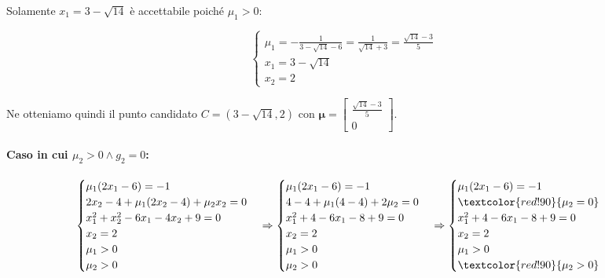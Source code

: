 \documentclass[\main/main.tex]{subfiles}
\begin{document}
Solamente $x_1 = 3 - \sqrt{14}$ è accettabile poiché $\mu_1 > 0$:

\[
	\begin{cases}
		\mu_1 = -\frac{1}{3 - \sqrt{14} - 6} =  \frac{1}{\sqrt{14} + 3} =  \frac{\sqrt{14} - 3}{5} \\
		x_1 = 3 - \sqrt{14}                                                                        \\
		x_2 = 2
	\end{cases}
\]

Ne otteniamo quindi il punto candidato $C = (3 - \sqrt{14}, 2)$ con $\bm{\mu} = \begin{bmatrix}
		\frac{\sqrt{14} - 3}{5} \\
		0
	\end{bmatrix}$.

\paragraph*{Caso in cui $\mu_2 > 0 \land g_2 = 0$:}
\[
	\begin{cases}
		\mu_1(2x_1 - 6)  = -1                     \\
		2x_2 -4 + \mu_1(2x_2 - 4) + \mu_2 x_2 = 0 \\
		x^2_1+x^2_2-6x_1-4x_2+9 = 0               \\
		x_2 = 2                                   \\
		\mu_1 > 0                                 \\
		\mu_2 > 0
	\end{cases}
	\Rightarrow
	\begin{cases}
		\mu_1(2x_1 - 6)  = -1            \\
		4 -4 + \mu_1(4 - 4) + 2\mu_2 = 0 \\
		x^2_1+4-6x_1-8+9 = 0             \\
		x_2 = 2                          \\
		\mu_1 > 0                        \\
		\mu_2 > 0
	\end{cases}
	\Rightarrow
	\begin{cases}
		\mu_1(2x_1 - 6)  = -1        \\
		\textcolor{red!90}{\mu_2 =0} \\
		x^2_1+4-6x_1-8+9 = 0         \\
		x_2 = 2                      \\
		\mu_1 > 0                    \\
		\textcolor{red!90}{\mu_2 > 0}
	\end{cases}
\]
\end{document}
